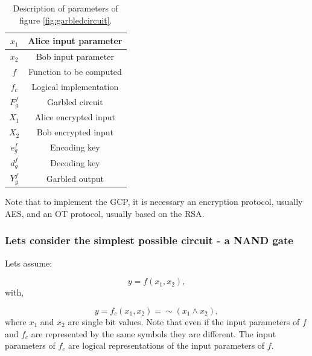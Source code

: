 \begin{refsection}
\begin{table}[H]
\centering

\begin{tabular}{|c|c|}
\hline
$x_1$                   & Alice input parameter             \\ \hline
$x_2$                   & Bob input parameter               \\ \hline
$f$                     & Function to be computed           \\ \hline
$f_c$                   & Logical implementation            \\ \hline
$F_g^f$                 & Garbled circuit                   \\ \hline
$X_1$                   & Alice encrypted input              \\ \hline
$X_2$                   & Bob encrypted input               \\ \hline
$e_g^f$                 & Encoding key                      \\ \hline
$d_g^f$                 & Decoding key                      \\ \hline
$Y_g^f$                 & Garbled output                    \\ \hline
\end{tabular}
\caption{Description of parameters of figure \ref{fig:garbledcircuit}.}
\end{table}
%
Note that to implement the GCP, it is necessary an encryption protocol, usually AES, and an OT protocol, usually based on the RSA.


\subsubsection{Lets consider the simplest possible circuit - a NAND gate}

Lets assume:

\begin{equation}\label{eq:f_to_be_computed}
  y=f(x_1,x_2),
\end{equation}
with,

\begin{equation}\label{eq:fc_to_be_computed}
  y=f_c(x_1, x_2) = \sim \left( x_1 \wedge x_2 \right),
\end{equation}
where $x_1$ and $x_2$ are single bit values. Note that even if the input parameters of $f$ and $f_c$ are represented by the same symbols they are different. The input parameters of $f_c$ are logical representations of the input parameters of $f$.


\end{refsection}
